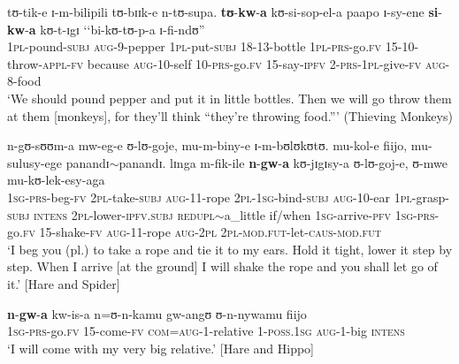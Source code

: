 \begin{exe}
\ex \label{exkwakuThievingMonkeys} \gll tʊ-tik-e ɪ-m-bilipili tʊ-bɪɪk-e n-tʊ-supa. \textbf{tʊ}-\textbf{kw}-\textbf{a} kʊ-si-sop-el-a paapo ɪ-sy-ene \textbf{si}-\textbf{kw}-\textbf{a} kʊ-t-ɪgɪ \textup{\lq\lq}bi-kʊ-tʊ-p-a ɪ-fi-ndʊ\textup{''}\\
\textsc{1pl}-pound-\textsc{subj} \textsc{aug}-9-pepper \textsc{1pl}-put-\textsc{subj} 18-13-bottle \textsc{1pl}-\textsc{prs}-go.\textsc{fv} 15-10-throw-\textsc{appl}-\textsc{fv} because \textsc{aug}-10-self 10-\textsc{prs}-go.\textsc{fv} 15-say-\textsc{ipfv} \phantom{\lq\lq}2-\textsc{prs}-\textsc{1pl}-give-\textsc{fv} \textsc{aug}-8-food\\
\glt `We should pound pepper and put it in little bottles. Then we will go throw them at them [monkeys], for they'll think ``they're throwing food.''{}' (Thieving Monkeys)%

\ex \label{exkwakuHareSpider}
\gll n-gʊ-sʊʊm-a mw-eg-e ʊ-lʊ-goje, mu-m-biny-e ɪ-m-bʊlʊkʊtʊ. mu-kol-e fiijo, mu-sulusy-ege panandɪ$\sim$panandɪ. lɪnga m-fik-ile \textbf{n}-\textbf{gw}-\textbf{a} kʊ-jɪgɪsy-a ʊ-lʊ-goj-e, ʊ-mwe mu-kʊ-lek-esy-aga\\
\textsc{1sg}-\textsc{prs}-beg-\textsc{fv} \textsc{2pl}-take-\textsc{subj} \textsc{aug}-11-rope \textsc{2pl}-\textsc{1sg}-bind-\textsc{subj} \textsc{aug}-10-ear \textsc{1pl}-grasp-\textsc{subj} \textsc{intens} \textsc{2pl}-lower-\textsc{ipfv.subj} \textsc{redupl}$\sim$a\_little if/when \textsc{1sg}-arrive-\textsc{pfv} \textsc{1sg}-\textsc{prs}-go.\textsc{fv} 15-shake-\textsc{fv} \textsc{aug}-11-rope  \textsc{aug}-\textsc{2pl} \textsc{2pl}-\textsc{mod.fut}-let-\textsc{caus}-\textsc{mod.fut}\\
\glt `I beg you (pl.) to take a rope and tie it to my ears. Hold it tight, lower it step by step. When I arrive [at the ground] I will shake the rope and you shall let go of it.' [Hare and Spider] %

\ex \label{exkwakuHareHippo}\gll \textbf{n}-\textbf{gw}-\textbf{a} kw-is-a n=ʊ-n-kamu gw-angʊ ʊ-n-nywamu fiijo\\
\textsc{1sg}-\textsc{prs}-go.\textsc{fv} 15-come-\textsc{fv} \textsc{com}=\textsc{aug}-1-relative 1-\textsc{poss.1sg} \textsc{aug}-1-big \textsc{intens}\\
\glt `I will come with my very big relative.' [Hare and Hippo] %
\end{exe}

